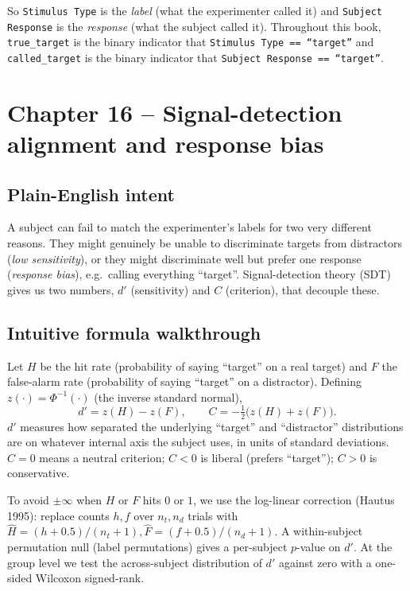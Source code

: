 \documentclass[11pt]{article}
\begin{document}
\noindent So \texttt{Stimulus Type} is the \emph{label} (what the experimenter
called it) and \texttt{Subject Response} is the \emph{response} (what the
subject called it). Throughout this book, \texttt{true\_target} is the
binary indicator that \texttt{Stimulus Type == ``target''} and
\texttt{called\_target} is the binary indicator that
\texttt{Subject Response == ``target''}.

\section{Chapter 16 -- Signal-detection alignment and response bias}

\subsection{Plain-English intent}

A subject can fail to match the experimenter's labels for two very different
reasons. They might genuinely be unable to discriminate targets from
distractors (\emph{low sensitivity}), or they might discriminate well but
prefer one response (\emph{response bias}), e.g.\ calling everything
``target''. Signal-detection theory (SDT) gives us two numbers,
\(d'\) (sensitivity) and \(C\) (criterion), that decouple these.

\subsection{Intuitive formula walkthrough}

Let $H$ be the hit rate (probability of saying ``target'' on a real target)
and $F$ the false-alarm rate (probability of saying ``target'' on a
distractor). Defining $z(\cdot) = \Phi^{-1}(\cdot)$ (the inverse standard
normal),
\[
d' = z(H) - z(F), \qquad C = -\tfrac{1}{2}\bigl(z(H) + z(F)\bigr).
\]
$d'$ measures how separated the underlying ``target'' and ``distractor''
distributions are on whatever internal axis the subject uses, in units of
standard deviations. $C=0$ means a neutral criterion; $C<0$ is liberal
(prefers ``target''); $C>0$ is conservative.

To avoid $\pm\infty$ when $H$ or $F$ hits $0$ or $1$, we use the
log-linear correction (Hautus 1995): replace counts $h, f$ over $n_t, n_d$
trials with
\(\hat H=(h+0.5)/(n_t+1), \hat F=(f+0.5)/(n_d+1)\).
A within-subject permutation null (label permutations) gives a per-subject
$p$-value on $d'$. At the group level we test the across-subject
distribution of $d'$ against zero with a one-sided Wilcoxon signed-rank.
\end{document}
